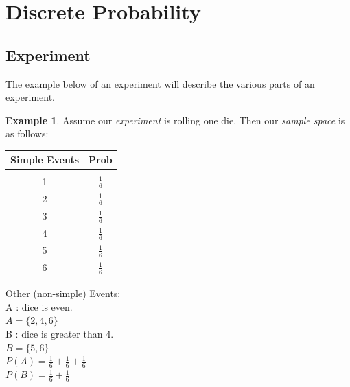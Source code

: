 \documentclass{article}
\theoremstyle{plain}
\theoremstyle{definition}
\newtheorem{defn}{Definition}[section]
\newtheorem{example}{Example}[section]
\theoremstyle{remark}
\begin{document}
%

\section{Discrete Probability}





\subsection{Experiment}
The example below of an experiment will describe the various parts of an experiment.
\begin{example}
Assume our \textit{experiment} is rolling one die. Then our \textit{sample space} is as follows:\\
\begin{multicols}{2}
  \begin{tabular}{c|c}
    Simple Events & Prob\\
    \hline\\[-8pt]
    1 & $\frac{1}{6}$\\[2pt]
    2 & $\frac{1}{6}$\\[2pt]
    3 & $\frac{1}{6}$\\[2pt]
    4 & $\frac{1}{6}$\\[2pt]
    5 & $\frac{1}{6}$\\[2pt]
    6 & $\frac{1}{6}$
  \end{tabular}
  \vfill
  \columnbreak
  \underline{Other (non-simple) Events:}\\
  A : dice is even.\\
  $A = \{2,4,6\}$\\
  B : dice is greater than 4.\\
  $B = \{5,6\}$\\
  $P(A) = \frac{1}{6} + \frac{1}{6} + \frac{1}{6}$\\
  $P(B) = \frac{1}{6} + \frac{1}{6}$
\end{multicols}
\end{example}
\end{document}

